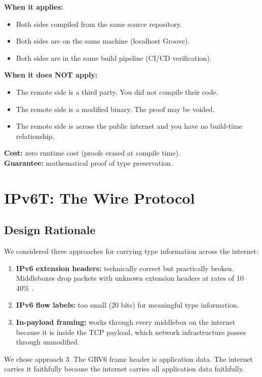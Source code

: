 \documentclass[11pt,a4paper]{article}
\begin{document}
\textbf{When it applies:}
\begin{itemize}
\item Both sides compiled from the same source repository.
\item Both sides are on the same machine (localhost Groove).
\item Both sides are in the same build pipeline (CI/CD verification).
\end{itemize}

\textbf{When it does NOT apply:}
\begin{itemize}
\item The remote side is a third party. You did not compile their code.
\item The remote side is a modified binary. The proof may be voided.
\item The remote side is across the public internet and you have no
  build-time relationship.
\end{itemize}

\textbf{Cost:} zero runtime cost (proofs erased at compile time).\\
\textbf{Guarantee:} mathematical proof of type preservation.

\section{IPv6T: The Wire Protocol}

\subsection{Design Rationale}

We considered three approaches for carrying type information across the
internet:

\begin{enumerate}
\item \textbf{IPv6 extension headers:} technically correct but
  practically broken. Middleboxes drop packets with unknown extension
  headers at rates of 10--40\% \cite{google_eh2015}.
\item \textbf{IPv6 flow labels:} too small (20 bits) for meaningful type
  information.
\item \textbf{In-payload framing:} works through every middlebox on the
  internet because it is inside the TCP payload, which network
  infrastructure passes through unmodified.
\end{enumerate}

We chose approach 3. The GRV6 frame header is application data. The
internet carries it faithfully because the internet carries all
application data faithfully.
\end{document}
